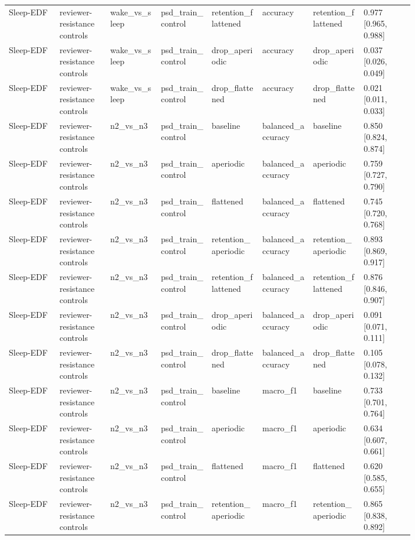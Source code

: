 \begin{longtable}{p{0.10\linewidth}p{0.10\linewidth}p{0.10\linewidth}p{0.10\linewidth}p{0.10\linewidth}p{0.10\linewidth}p{0.10\linewidth}p{0.10\linewidth}}
Sleep-EDF & reviewer-resistance controls & wake\_vs\_sleep & psd\_train\_control & retention\_flattened & accuracy & retention\_flattened & 0.977 [0.965, 0.988]\\
Sleep-EDF & reviewer-resistance controls & wake\_vs\_sleep & psd\_train\_control & drop\_aperiodic & accuracy & drop\_aperiodic & 0.037 [0.026, 0.049]\\
Sleep-EDF & reviewer-resistance controls & wake\_vs\_sleep & psd\_train\_control & drop\_flattened & accuracy & drop\_flattened & 0.021 [0.011, 0.033]\\
Sleep-EDF & reviewer-resistance controls & n2\_vs\_n3 & psd\_train\_control & baseline & balanced\_accuracy & baseline & 0.850 [0.824, 0.874]\\
Sleep-EDF & reviewer-resistance controls & n2\_vs\_n3 & psd\_train\_control & aperiodic & balanced\_accuracy & aperiodic & 0.759 [0.727, 0.790]\\
Sleep-EDF & reviewer-resistance controls & n2\_vs\_n3 & psd\_train\_control & flattened & balanced\_accuracy & flattened & 0.745 [0.720, 0.768]\\
Sleep-EDF & reviewer-resistance controls & n2\_vs\_n3 & psd\_train\_control & retention\_aperiodic & balanced\_accuracy & retention\_aperiodic & 0.893 [0.869, 0.917]\\
Sleep-EDF & reviewer-resistance controls & n2\_vs\_n3 & psd\_train\_control & retention\_flattened & balanced\_accuracy & retention\_flattened & 0.876 [0.846, 0.907]\\
Sleep-EDF & reviewer-resistance controls & n2\_vs\_n3 & psd\_train\_control & drop\_aperiodic & balanced\_accuracy & drop\_aperiodic & 0.091 [0.071, 0.111]\\
Sleep-EDF & reviewer-resistance controls & n2\_vs\_n3 & psd\_train\_control & drop\_flattened & balanced\_accuracy & drop\_flattened & 0.105 [0.078, 0.132]\\
Sleep-EDF & reviewer-resistance controls & n2\_vs\_n3 & psd\_train\_control & baseline & macro\_f1 & baseline & 0.733 [0.701, 0.764]\\
Sleep-EDF & reviewer-resistance controls & n2\_vs\_n3 & psd\_train\_control & aperiodic & macro\_f1 & aperiodic & 0.634 [0.607, 0.661]\\
Sleep-EDF & reviewer-resistance controls & n2\_vs\_n3 & psd\_train\_control & flattened & macro\_f1 & flattened & 0.620 [0.585, 0.655]\\
Sleep-EDF & reviewer-resistance controls & n2\_vs\_n3 & psd\_train\_control & retention\_aperiodic & macro\_f1 & retention\_aperiodic & 0.865 [0.838, 0.892]\\

\end{longtable}
